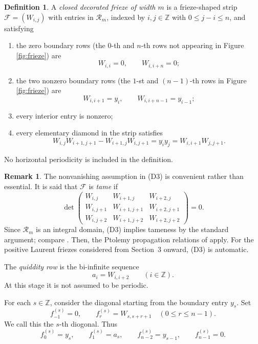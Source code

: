 \documentclass[amstex,11pt,reqno]{amsart}
\theoremstyle{definition}
\newtheorem{definition}[theorem]{Definition}
\newtheorem{remark}[theorem]{Remark}
\newcommand{\Z}{\mathbb Z}
\newcommand{\cF}{\mathcal F}
\newcommand{\cR}{\mathscr R}
\begin{document}
\begin{definition}\label{def:closed-decorated}
A \emph{closed decorated frieze of width $m$} is a frieze-shaped strip $\cF=(W_{i,j})$ with entries in $\cR_m$, 
indexed by $i,j\in\Z$ with $0 \leq j-i \leq n$,
and satisfying
\begin{enumerate}[label=\textup{(D\arabic*)},leftmargin=2.6em]
\item the zero boundary rows (the $0$-th and $n$-th rows not appearing in Figure \ref{fig:frieze}) are
\[
 W_{i,i}=0,\qquad W_{i,i+n}=0;
\]
\item the two nonzero boundary rows (the $1$-st and $(n-1)$-th rows in Figure \ref{fig:frieze}) are
\[
 W_{i,i+1}=y_i,\qquad W_{i,i+n-1}=y_{i-1};
\]
\item every interior entry is nonzero;
\item every elementary diamond in the strip satisfies
\begin{equation}\label{eq:diamond}
 W_{i,j}W_{i+1,j+1}-W_{i+1,j}W_{i,j+1}
 =y_i y_j
 =W_{i,i+1}W_{j,j+1}.
\end{equation}
\end{enumerate}
No horizontal periodicity is included in the definition.
\end{definition}

\begin{remark}
The nonvanishing assumption in {\rm (D3)} is convenient rather than
essential. It is said that $\mathcal F$ is \emph{tame} if
$$
\det
\begin{pmatrix}
W_{i,j}&W_{i+1,j}&W_{i+2,j}\\
W_{i,j+1}&W_{i+1,j+1}&W_{i+2,j+1}\\
W_{i,j+2}&W_{i+1,j+2}&W_{i+2,j+2}
\end{pmatrix}=0.
$$
Since $\mathcal R_m$ is an integral domain, {\rm (D3)} implies
tameness by the standard argument; compare
\cite[Proposition~2.6]{CHJ2020}.  Then, the Ptolemy propagation relations
of \cite[Theorem~3.3]{CHJ2020} apply. For the positive Laurent friezes considered from Section~3 onward,
{\rm (D3)} is automatic.
\end{remark}

The \emph{quiddity row} is the bi-infinite sequence
\[
 a_i=W_{i,i+2}\qquad(i\in\Z).
\]
At this stage it is not assumed to be periodic.

For each $s\in\Z$, consider the diagonal starting from the boundary entry $y_s$. Set
\begin{equation*}\label{eq:diag-def}
 f^{(s)}_{-1}=0,
 \qquad
 f^{(s)}_r=W_{s,s+r+1}\quad(0\leq r\leq n-1).
\end{equation*}
We call this the $s$-th diogonal. Thus
\[
 f^{(s)}_0=y_s,
 \qquad
 f^{(s)}_1=a_s,
 \qquad
 f^{(s)}_{n-2}=y_{s-1},
 \qquad
 f^{(s)}_{n-1}=0.
\]
\end{document}
